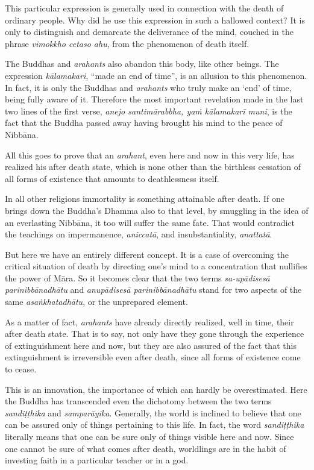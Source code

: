This particular expression is generally used in connection with the death of ordinary people. Why did he use this expression in such a hallowed context? It is only to distinguish and demarcate the deliverance of the mind, couched in the phrase \emph{vimokkho cetaso ahu}, from the phenomenon of death itself.

The Buddhas and \emph{arahants} also abandon this body, like other beings. The expression \emph{kālamakari}, ``made an end of time'', is an allusion to this phenomenon. In fact, it is only the Buddhas and \emph{arahants} who truly make an `end' of time, being fully aware of it. Therefore the most important revelation made in the last two lines of the first verse, \emph{anejo santimārabbha, yaṁ kālamakarī muni}, is the fact that the Buddha passed away having brought his mind to the peace of Nibbāna.

All this goes to prove that an \emph{arahant}, even here and now in this very life, has realized his after death state, which is none other than the birthless cessation of all forms of existence that amounts to deathlessness itself.

In all other religions immortality is something attainable after death. If one brings down the Buddha's Dhamma also to that level, by smuggling in the idea of an everlasting Nibbāna, it too will suffer the same fate. That would contradict the teachings on impermanence, \emph{aniccatā}, and insubstantiality, \emph{anattatā}.

But here we have an entirely different concept. It is a case of overcoming the critical situation of death by directing one's mind to a concentration that nullifies the power of Māra. So it becomes clear that the two terms \emph{sa-upādisesā parinibbānadhātu} and \emph{anupādisesā parinibbānadhātu} stand for two aspects of the same \emph{asaṅkhatadhātu}, or the unprepared element.

As a matter of fact, \emph{arahants} have already directly realized, well in time, their after death state. That is to say, not only have they gone through the experience of extinguishment here and now, but they are also assured of the fact that this extinguishment is irreversible even after death, since all forms of existence come to cease.

This is an innovation, the importance of which can hardly be overestimated. Here the Buddha has transcended even the dichotomy between the two terms \emph{sandiṭṭhika} and \emph{samparāyika}. Generally, the world is inclined to believe that one can be assured only of things pertaining to this life. In fact, the word \emph{sandiṭṭhika} literally means that one can be sure only of things visible here and now. Since one cannot be sure of what comes after death, worldlings are in the habit of investing faith in a particular teacher or in a god.


